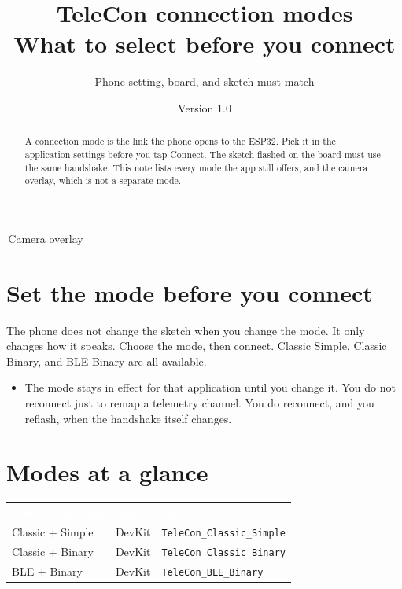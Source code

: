 \documentclass[12pt,a4paper]{article}
\title{TeleCon connection modes\\[0.3em]
\large What to select before you connect}
\author{Phone setting, board, and sketch must match}
\date{Version 1.0 \quad 2026}
\newcommand{\code}[1]{\nolinkurl{#1}}
\newcommand{\thc}[1]{\textcolor{white}{\bfseries #1}}
\newcommand{\chip}[2]{\colorbox{#1}{\strut\,\scriptsize #2\,}}
\begin{document}
\maketitle

\begin{abstract}
A connection mode is the link the phone opens to the ESP32. Pick it in the
application settings before you tap Connect. The sketch flashed on the board
must use the same handshake. This note lists every mode the app still offers,
and the camera overlay, which is not a separate mode.
\end{abstract}

{\sffamily\scriptsize
\chip{TblKnob}{Camera overlay}}

\tableofcontents
\vspace{1em}

\section{Set the mode before you connect}

The phone does not change the sketch when you change the mode. It only
changes how it speaks. Choose the mode, then connect. Classic Simple,
Classic Binary, and BLE Binary are all available.

\begin{itemize}[leftmargin=1.4cm]
  \item The mode stays in effect for that application until you change it.
        You do not reconnect just to remap a telemetry channel. You do
        reconnect, and you reflash, when the handshake itself changes.
\end{itemize}

\section{Modes at a glance}

\begin{center}
\small
\renewcommand{\arraystretch}{1.25}
\setlength{\tabcolsep}{4pt}
\begin{tabular}{>{\raggedright\arraybackslash}p{4.2cm}
                >{\raggedright\arraybackslash}p{2.4cm}
                >{\raggedright\arraybackslash}p{7.2cm}}
\rowcolor{TblHead}
\thc{Mode in the app} & \thc{Board} & \thc{Sketch} \\
\rowcolor{TblChan}
Classic + Simple & DevKit & \code{TeleCon_Classic_Simple} \\
\rowcolor{TblChan}
Classic + Binary & DevKit & \code{TeleCon_Classic_Binary} \\
\rowcolor{TblChan}
BLE + Binary & DevKit & \code{TeleCon_BLE_Binary} \\
\end{tabular}
\end{center}
\end{document}
